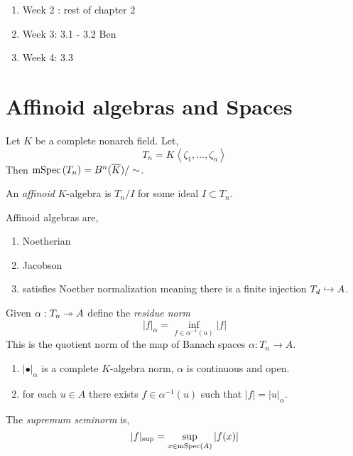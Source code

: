 \documentclass[12pt]{article}
\begin{document}
\begin{enumerate}
\item Week 2 : rest of chapter 2
\item Week 3: 3.1 - 3.2 Ben 
\item Week 4: 3.3
\end{enumerate}


\section{Affinoid algebras and Spaces}

Let $K$ be a complete nonarch field. Let,
\[ T_n = K \left< \zeta_1, \dots, \zeta_n \right> \]
Then $\mathrm{mSpec}\left( T_n \right) = B^n(\overline{K}) / \sim$.

\begin{defn}
An \textit{affinoid} $K$-algebra is $T_n / I$ for some ideal $I \subset T_n$.
\end{defn}

\begin{prop}
Affinoid algebras are,
\begin{enumerate}
\item Noetherian
\item Jacobson
\item satisfies Noether normalization meaning there is a finite injection $T_d \hookrightarrow A$. 
\end{enumerate}
\end{prop}

\begin{defn}
Given $\alpha : T_n \twoheadrightarrow A$ define the \textit{residue norm} 
\[ |f|_{\alpha} = \inf_{f \in \alpha^{-1}(u)} |f| \]
This is the quotient norm of the map of Banach spaces $\alpha : T_n \to A$. 
\end{defn}

\begin{prop}
\begin{enumerate}
\item $| \bullet |_{\alpha}$ is a complete $K$-algebra norm, $\alpha$ is continuous and open. 

\item for each $u \in A$ there exists $f \in \alpha^{-1}(u)$ such that $|f| = |u|_{\alpha}$.
\end{enumerate}
\end{prop}

\begin{defn}
The \textit{supremum seminorm} is,
\[ |f|_{\sup} = \sup_{x \in \mathrm{mSpec}\left( A \right)} |f(x)| \]
\end{defn}
\end{document}
